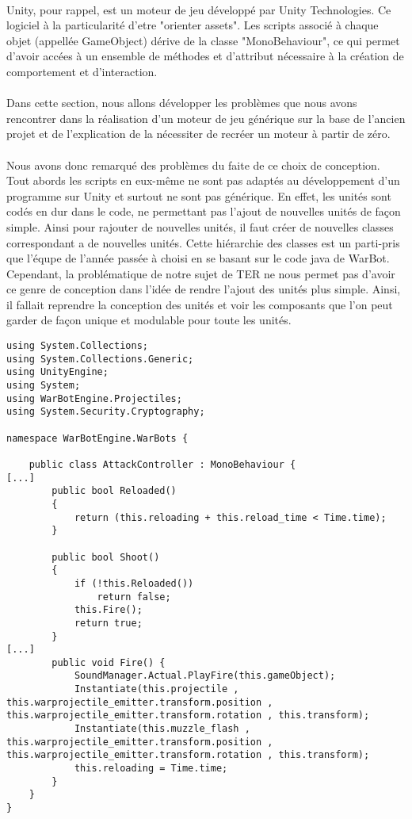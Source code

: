 \documentclass{report}
\begin{document}
\paragraph{}Unity, pour rappel, est un moteur de jeu développé par Unity Technologies. Ce logiciel à la particularité d'etre "orienter assets". Les scripts associé à chaque objet (appellée GameObject) dérive de la classe "MonoBehaviour", ce qui permet d'avoir accées à un ensemble de méthodes et d'attribut nécessaire à la création de comportement et d'interaction.
\paragraph{} Dans cette section, nous allons développer les problèmes que nous avons rencontrer dans la réalisation d'un moteur de jeu générique sur la base de l'ancien projet et de l'explication de la nécessiter de recréer un moteur à partir de zéro.
\paragraph{} Nous avons donc remarqué des problèmes du faite de ce choix de conception. Tout abords les scripts en eux-même ne sont pas adaptés au développement d'un programme sur Unity et surtout ne sont pas générique.  En effet, les unités sont codés en dur dans le code, ne permettant pas l'ajout de nouvelles unités de façon simple. Ainsi pour rajouter de nouvelles unités, il faut créer de nouvelles classes correspondant a de nouvelles unités. Cette hiérarchie des classes est un parti-pris que l'équpe de l'année passée à choisi en se basant sur le code java de WarBot. Cependant, la problématique de notre sujet de TER ne nous permet pas d'avoir ce genre de conception dans l'idée de rendre l'ajout des unités plus simple. Ainsi, il fallait reprendre la conception des unités et voir les composants que l'on peut garder de façon unique et modulable pour toute les unités.
\begin{lstlisting}[language={[Sharp]C}, caption= Code du script AttackController.cs de l'ancien projet]
using System.Collections;
using System.Collections.Generic;
using UnityEngine;
using System;
using WarBotEngine.Projectiles;
using System.Security.Cryptography;

namespace WarBotEngine.WarBots {

    public class AttackController : MonoBehaviour {
[...]
        public bool Reloaded()
        {
            return (this.reloading + this.reload_time < Time.time);
        }

        public bool Shoot()
        {
            if (!this.Reloaded())
                return false;
            this.Fire();
            return true;
        }
[...]
        public void Fire() {
            SoundManager.Actual.PlayFire(this.gameObject);
            Instantiate(this.projectile , this.warprojectile_emitter.transform.position , this.warprojectile_emitter.transform.rotation , this.transform);
            Instantiate(this.muzzle_flash , this.warprojectile_emitter.transform.position , this.warprojectile_emitter.transform.rotation , this.transform);
            this.reloading = Time.time;
        }
    }
}
\end{lstlisting}
\end{document}
